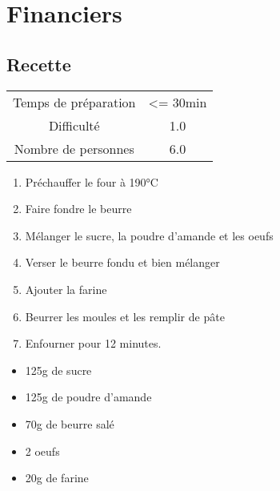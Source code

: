 \newpage
\section{Financiers}
    \label{sec:Financiers}
    \subsection{Recette}
    \vspace{1cm}


    \begin{center}
        \begin{tabular}{c|c}
            Temps de préparation & <= 30min \\
            Difficulté & 1.0 \\
            Nombre de personnes & 6.0 
        \end{tabular}
    \end{center}{}

    \vspace{1cm}
    \hline
    \vspace{1cm}

    \begin{minipage}{.7\textwidth}
        \begin{enumerate}
            \item Préchauffer le four à 190°C
	    \item Faire fondre le beurre
	    \item Mélanger le sucre, la poudre d'amande et les oeufs
	    \item Verser le beurre fondu et bien mélanger
	    \item Ajouter la farine
	    \item Beurrer les moules et les remplir de pâte
	    \item  Enfourner pour 12 minutes.

        \end{enumerate}
    \end{minipage}
    \begin{minipage}{.3\textwidth}
        \begin{flushleft}
        \begin{itemize}
            \item 125g de sucre
	    \item 125g de poudre d'amande
	    \item 70g de beurre salé
	    \item 2 oeufs
	    \item 20g de farine

        \end{itemize}
        \end{flushleft}
    \end{minipage}
    
